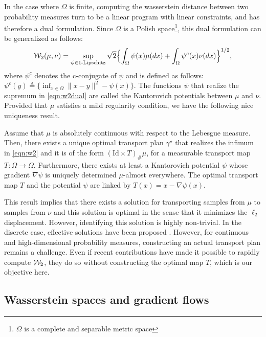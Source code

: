 In the case where $\Omega$ is finite, computing the wasserstein distance between two probability measures turn to be  a linear program with linear constraints, and has therefore a dual formulation. Since $\Omega$ is a Polish space\footnote{$\Omega$ is a complete and separable metric space}, this dual formulation can be generalized as follows:
\begin{align}
{\cal W}_2(\mu,\nu) = \sup_{\psi \in \textnormal{1-Lipschitz}} \sqrt{2}\Bigl\{ \int_\Omega \psi(x) \mu(dx) + \int_\Omega \psi^c(x) \nu(dx) \Bigr\}^{1/2}, \label{eqn:w2dual}
\end{align}
where $\psi^c$ denotes the c-conjugate of $\psi$ and is defined as follows: $\psi^c(y) \triangleq \{ \inf_{x\in \Omega} \| x-y\|^2 - \psi(x)\}$. The functions $\psi$ that realize the supremum in \eqref{eqn:w2dual} are called the Kantorovich potentials between $\mu$ and $\nu$.
%
Provided that $\mu$ satisfies a mild regularity condition, we have the following nice uniqueness result.
\begin{thm}
\label{thm:unqmap}
Assume that  $\mu$ is absolutely continuous with respect to the Lebesgue measure. Then, there exists a unique optimal transport plan $\gamma^\star$ that realizes the infimum in \eqref{eqn:w2} and it is of the form $(\text{Id} \times T)_\# \mu$, for a measurable transport map $T : \Omega \to \Omega$. Furthermore, there exists at least a Kantorovich potential $\psi$ whose gradient $\nabla \psi$ is uniquely determined $\mu$-almost everywhere. The optimal transport map $T$ and the potential $\psi$ are linked by $T(x) = x- \nabla \psi(x)$.
\end{thm}


This result implies that there exists a solution for transporting samples from $\mu$ to samples from $\nu$ and this solution is optimal in the sense that it minimizes the $\ell_2$ displacement. However, identifying this solution is highly non-trivial. In the discrete case, effective solutions have been proposed \cite{cuturi2013sinkhorn}. However, for continuous and high-dimensional probability measures, constructing an actual transport plan remains a challenge. Even if recent contributions \cite{genevay2016stochastic} have made it possible to rapidly compute ${\cal W}_2$, they do so without constructing the optimal map $T$, which is our objective here.


\subsection{Wasserstein spaces and gradient flows}



